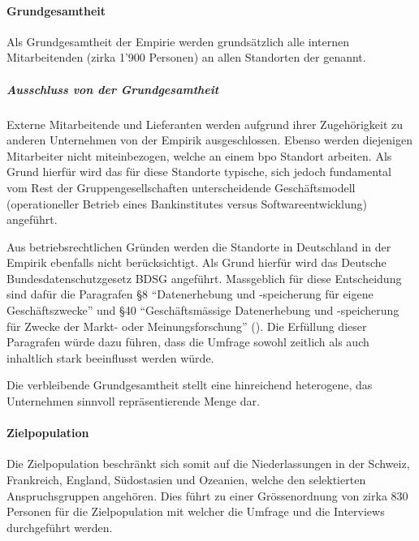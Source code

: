 \documentclass[../../main.tex]{subfiles}
\begin{document}
\paragraph*{Grundgesamtheit}\mbox{}

\begin{sloppypar}
Als Grundgesamtheit der Empirie werden grundsätzlich alle internen Mitarbeitenden (zirka 1'900 Personen) an allen Standorten der {\group} genannt.

\subparagraph*{Ausschluss von der Grundgesamtheit}\mbox{}

Externe Mitarbeitende und Lieferanten werden aufgrund ihrer Zugehörigkeit zu anderen Unternehmen von der Empirik ausgeschlossen. Ebenso werden diejenigen Mitarbeiter nicht miteinbezogen, welche an einem \acrshort{bpo} Standort arbeiten. Als Grund hierfür wird das für diese Standorte typische, sich jedoch fundamental vom Rest der Gruppengesellschaften  unterscheidende Geschäftsmodell (operationeller Betrieb eines Bankinstitutes versus Softwareentwicklung) angeführt.

Aus betriebsrechtlichen Gründen werden die Standorte in Deutschland in der Empirik ebenfalls nicht berücksichtigt. Als Grund hierfür wird das  Deutsche Bundesdatenschutzgesetz BDSG angeführt. Massgeblich für diese Entscheidung sind dafür die Paragrafen \S8 "`Datenerhebung und -speicherung für eigene Geschäftszwecke"' und \S40 "`Geschäftsmässige Datenerhebung und -speicherung für Zwecke der Markt- oder Meinungsforschung"' (\cite{bmjv_bundesdatenschutzgesetz_1990}). Die Erfüllung dieser Paragrafen würde dazu führen, dass die Umfrage sowohl zeitlich als auch inhaltlich stark beeinflusst werden würde.

Die verbleibende Grundgesamtheit stellt eine hinreichend heterogene, das Unternehmen sinnvoll repräsentierende Menge dar.
\end{sloppypar}

\paragraph*{Zielpopulation}\mbox{}

\begin{sloppypar}
Die Zielpopulation beschränkt sich somit auf die Niederlassungen in der Schweiz, Frankreich, England, Südostasien und Ozeanien, welche den selektierten Anspruchsgruppen angehören. Dies führt zu einer Grössenordnung von zirka 830 Personen für die Zielpopulation mit welcher die Umfrage und die Interviews durchgeführt werden.
\end{sloppypar}
\end{document}
